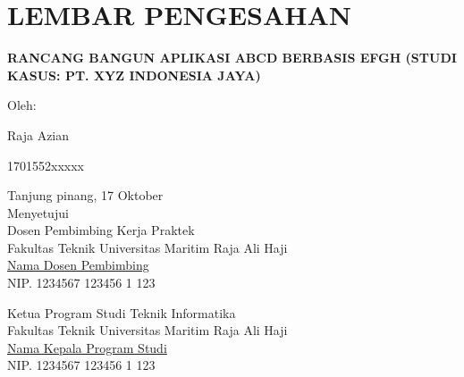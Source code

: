 %
%
%

\chapter*{\centering LEMBAR PENGESAHAN}

\thispagestyle{empty}


\begin{center}
    \textbf{RANCANG BANGUN APLIKASI ABCD BERBASIS EFGH (STUDI KASUS: PT. XYZ INDONESIA JAYA)}
\end{center}

\vspace{1cm}

\begin{center}
    Oleh:
    \begin{multicols}{2}
        {Raja Azian}

        {1701552xxxxx}
    \end{multicols}

    \vspace{1cm}

    Tanjung pinang, 17 Oktober \the\year{}\\
    Menyetujui\\
    Dosen Pembimbing Kerja Praktek \\
    Fakultas Teknik Universitas Maritim Raja Ali Haji \\
    \vspace{2cm}
    \underline{ Nama Dosen Pembimbing } \\
    NIP. 1234567 123456 1 123 \\

    \vspace{2.75cm}

    Ketua Program Studi Teknik Informatika \\
    Fakultas Teknik Universitas Maritim Raja Ali Haji \\
    \vspace{2cm}
    \underline{ Nama Kepala Program Studi } \\
    NIP. 1234567 123456 1 123 \\
\end{center}
\newpage